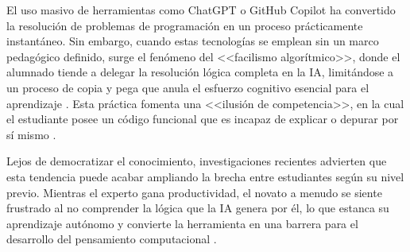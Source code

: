 El uso masivo de herramientas como ChatGPT o GitHub Copilot ha convertido la resolución de problemas de programación en un proceso prácticamente instantáneo. Sin embargo, cuando estas tecnologías se emplean sin un marco pedagógico definido, surge el fenómeno del <<facilismo algorítmico>>, donde el alumnado tiende a delegar la resolución lógica completa en la IA, limitándose a un proceso de copia y pega que anula el esfuerzo cognitivo esencial para el aprendizaje \cite{chen2024plagiarism}. Esta práctica fomenta una <<ilusión de competencia>>, en la cual el estudiante posee un código funcional que es incapaz de explicar o depurar por sí mismo \cite{prather2024widening}. 

Lejos de democratizar el conocimiento, investigaciones recientes advierten que esta tendencia puede acabar ampliando la brecha entre estudiantes según su nivel previo. Mientras el experto gana productividad, el novato a menudo se siente frustrado al no comprender la lógica que la IA genera por él, lo que estanca su aprendizaje autónomo y convierte la herramienta en una barrera para el desarrollo del pensamiento computacional \cite{prather2024widening}.